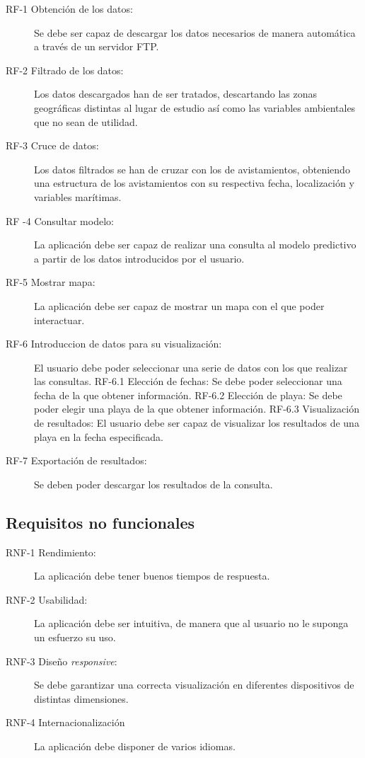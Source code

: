 \begin{description}
	\item[RF-1 Obtención de los datos:] Se debe ser capaz de descargar los datos necesarios de manera automática a través de un servidor FTP.
	\item[RF-2 Filtrado de los datos:] Los datos descargados han de ser tratados, descartando las zonas geográficas distintas al lugar de estudio así como las variables ambientales que no sean de utilidad.
	\item[RF-3 Cruce de datos:] Los datos filtrados se han de cruzar con los de avistamientos, obteniendo una estructura de los avistamientos con su respectiva fecha, localización y variables marítimas.	
	\item[RF -4 Consultar modelo:] La aplicación debe ser capaz de realizar una consulta al modelo predictivo a partir de los datos introducidos por el usuario.
	\item[RF-5 Mostrar mapa:] La aplicación debe ser capaz de mostrar un mapa con el que poder interactuar.
	\item[RF-6 Introduccion de datos para su visualización:] El usuario debe poder seleccionar una serie de datos con los que realizar las consultas.
	\subitem RF-6.1 Elección de fechas: Se debe poder seleccionar una fecha de la que obtener información.
	\subitem RF-6.2 Elección de playa: Se debe poder elegir una playa de la que obtener información.
	\subitem RF-6.3 Visualización de resultados: El usuario debe ser capaz de visualizar los resultados de una playa en la fecha especificada.	
	\item[RF-7 Exportación de resultados:] Se deben poder descargar los resultados de la consulta.
\end{description}

	\subsection{Requisitos no funcionales}

\begin{description}
	\item[RNF-1 Rendimiento:] La aplicación debe tener buenos tiempos de respuesta.
	\item[RNF-2 Usabilidad:] La aplicación debe ser intuitiva, de manera que al usuario no le suponga un esfuerzo su uso.
	\item[RNF-3 Diseño \emph{responsive}:] Se debe garantizar una correcta visualización en diferentes dispositivos de distintas dimensiones.
	\item[RNF-4 Internacionalización] La aplicación debe disponer de varios idiomas.
\end{description}


